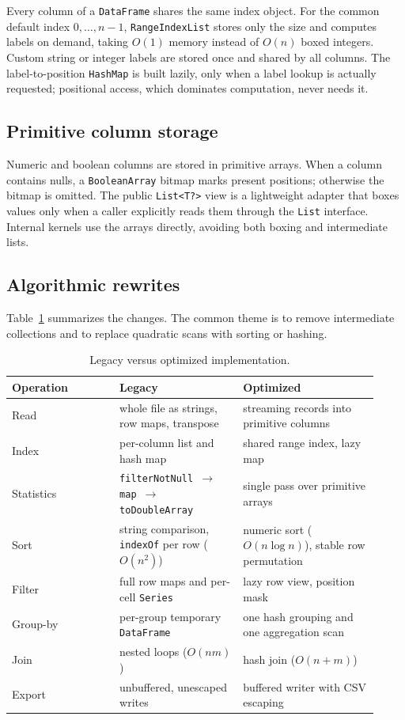 \documentclass[11pt,a4paper]{article}
\newcommand{\code}[1]{\texttt{#1}}
\begin{document}
Every column of a \code{DataFrame} shares the same index object.  For the common default index
$0,\ldots,n-1$, \code{RangeIndexList} stores only the size and computes labels on demand, taking
$O(1)$ memory instead of $O(n)$ boxed integers.  Custom string or integer labels are stored once
and shared by all columns.  The label-to-position \code{HashMap} is built lazily, only when a
label lookup is actually requested; positional access, which dominates computation, never needs it.

\subsection{Primitive column storage}

Numeric and boolean columns are stored in primitive arrays.  When a column contains nulls, a
\code{BooleanArray} bitmap marks present positions; otherwise the bitmap is omitted.  The public
\code{List<T?>} view is a lightweight adapter that boxes values only when a caller explicitly reads
them through the \code{List} interface.  Internal kernels use the arrays directly, avoiding both
boxing and intermediate lists.

\subsection{Algorithmic rewrites}

Table~\ref{tab:design} summarizes the changes.  The common theme is to remove intermediate
collections and to replace quadratic scans with sorting or hashing.

\begin{table}[H]
\centering
\small
\caption{Legacy versus optimized implementation.}
\label{tab:design}
\begin{tabular}{@{}p{0.27\linewidth}p{0.31\linewidth}p{0.34\linewidth}@{}}
\toprule
Operation & Legacy & Optimized \\
\midrule
Read & whole file as strings, row maps, transpose & streaming records into primitive columns \\
Index & per-column list and hash map & shared range index, lazy map \\
Statistics & \code{filterNotNull $\to$ map $\to$ toDoubleArray} & single pass over primitive arrays \\
Sort & string comparison, \code{indexOf} per row ($O(n^2)$) & numeric sort ($O(n\log n)$), stable row permutation \\
Filter & full row maps and per-cell \code{Series} & lazy row view, position mask \\
Group-by & per-group temporary \code{DataFrame} & one hash grouping and one aggregation scan \\
Join & nested loops ($O(nm)$) & hash join ($O(n+m)$) \\
Export & unbuffered, unescaped writes & buffered writer with CSV escaping \\
\bottomrule
\end{tabular}
\end{table}
\end{document}
